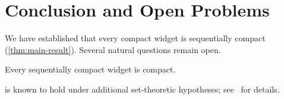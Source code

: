 
\chapter{Conclusion and Open Problems}\label{cha:conclusion}

We have established that every compact widget is sequentially compact
(\cref{thm:main-result}).
Several natural questions remain open.

\begin{conjecture}\label{conj:converse}
  Every sequentially compact widget is compact.
\end{conjecture}

\begin{remark}\label{rem:counterexample}
   is known to hold under additional set-theoretic
  hypotheses;
  see~\cite{placeholder2025} for details.
\end{remark}


